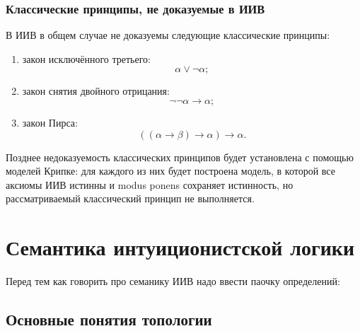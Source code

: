 \documentclass[12pt,a4paper,oneside,openany]{book}
\theoremstyle{definition}
\theoremstyle{plain}
\theoremstyle{remark}
\begin{document}
\subsubsection{Классические принципы, не доказуемые в ИИВ}

В ИИВ в общем случае не доказуемы следующие классические принципы:

\begin{enumerate}
    \item закон исключённого третьего:
          \[
          \alpha\lor\neg\alpha;
          \]

    \item закон снятия двойного отрицания:
          \[
          \neg\neg\alpha\to\alpha;
          \]

    \item закон Пирса:
          \[
          ((\alpha\to\beta)\to\alpha)\to\alpha.
          \]
\end{enumerate}


Позднее недоказуемость классических принципов будет установлена с
помощью моделей Крипке: для каждого из них будет построена модель,
в которой все аксиомы ИИВ истинны и modus ponens сохраняет истинность,
но рассматриваемый классический принцип не выполняется.



































\section{Семантика интуиционистской логики}

Перед тем как говорить про семанику ИИВ надо ввести паочку определений:

\subsection{Основные понятия топологии}
\end{document}
